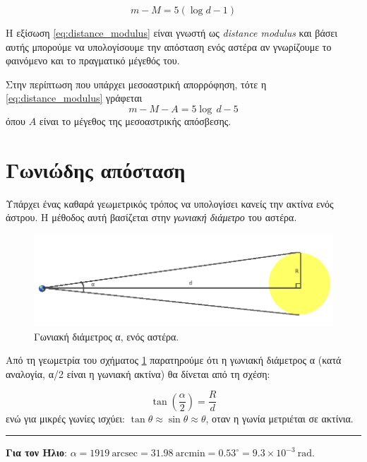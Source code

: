\begin{equation}
    \label{eq:distance_modulus}
    m-M = 5(\log d - 1)
\end{equation}

Η εξίσωση \eqref{eq:distance_modulus} είναι γνωστή ως \textit{distance modulus} και βάσει αυτής μπορούμε να υπολογίσουμε την απόσταση ενός αστέρα αν γνωρίζουμε το φαινόμενο και το πραγματικό μέγεθός του.

Στην περίπτωση που υπάρχει μεσοαστρική απορρόφηση, τότε η \eqref{eq:distance_modulus} γράφεται
\begin{equation}
    m - M - A = 5\log\,d - 5
\end{equation}
όπου $A$ είναι το μέγεθος της μεσοαστρικής απόσβεσης.

\section{Γωνιώδης απόσταση}
Υπάρχει ένας καθαρά γεωμετρικός τρόπος να υπολογίσει κανείς την ακτίνα ενός άστρου. Η μέθοδος αυτή βασίζεται στην \textit{γωνιακή διάμετρο} του αστέρα.

\begin{figure}[h]
    \centering
    \includegraphics[scale=0.4]{Figures/angular_diameter.png}
    \caption{Γωνιακή διάμετρος α, ενός αστέρα. }
    \label{fig:angular_diameter}
\end{figure}

Από τη γεωμετρία του σχήματος \ref{fig:angular_diameter} παρατηρούμε ότι η γωνιακή διάμετρος α (κατά αναλογία, α/2 είναι η γωνιακή ακτίνα) θα δίνεται από τη σχέση:

\begin{equation}
    \label{eq:angular_diameter}
    \tan \left( \frac{\alpha}{2} \right) = \frac{R}{d}
\end{equation}
ενώ για μικρές γωνίες ισχύει: $\tan \theta \approx \sin \theta \approx \theta$, οταν η γωνία μετριέται σε ακτίνια.
\\

{\color{red} \hrule}
\textbf{Για τον Ήλιο}: $\alpha = 1919 \ \text{arcsec} = 31.98 \ \text{arcmin} = 0.53^{\circ} = 9.3 \times 10^{-3} \ \text{rad}$.

